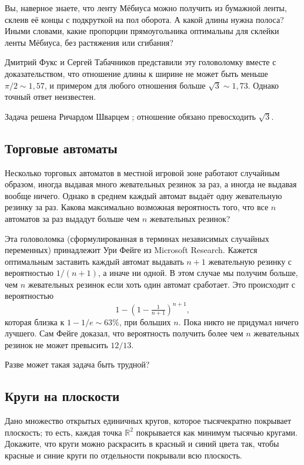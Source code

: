 Вы, наверное знаете, что ленту Мёбиуса можно получить из бумажной ленты, склеив её концы с подкруткой на пол оборота.
А какой длины нужна полоса?
Иными словами, какие пропорции прямоугольника оптимальны для склейки ленты Мёбиуса, без растяжения или сгибания?

Дмитрий Фукс и Сергей Табачников представили эту головоломку \cite[Лекция 14]{19} вместе с доказательством, что отношение длины к ширине не может быть меньше $\pi/2 \sim 1{,}57$, и примером для любого отношения больше $\sqrt{3} \sim 1{,}73$.
Однако точный ответ неизвестен.

\begin{addedbytheeditors}
Задача решена Ричардом Шварцем \cite{schwartz}; отношение обязано превосходить $\sqrt{3}$.\pr
\end{addedbytheeditors}


\subsection*{Торговые автоматы}

Несколько торговых автоматов в местной игровой зоне работают случайным образом,
иногда выдавая много жевательных резинок за раз, а иногда не выдавая вообще ничего.
Однако в среднем каждый автомат выдаёт одну жевательную резинку за раз.
Какова максимально возможная вероятность того, что все $n$ автоматов за раз выдадут больше чем $n$ жевательных резинок?

\medskip

Эта головоломка (сформулированная в терминах независимых случайных переменных) принадлежит Ури Фейге из Microsoft Research.
Кажется оптимальным заставить каждый автомат выдавать $n + 1$ жевательную резинку с вероятностью $1/(n + 1)$,
а иначе ни одной.
В этом случае мы получим больше, чем $n$ жевательных резинок если хоть один автомат сработает.
Это происходит с вероятностью
\[1-(1-\tfrac1{n+1})^{n+1},\]
которая близка к $1 - 1/e \sim 63\%$, при больших $n$.
Пока никто не придумал ничего лучшего.
Сам Фейге доказал, что вероятность получить более чем $n$ жевательных резинок не может превысить $12/13$.

Разве может такая задача быть трудной?

\subsection*{Круги на плоскости}

Дано множество открытых единичных кругов, которое тысячекратно покрывает плоскость;
то есть, каждая точка $\mathbb{R}^2$ покрывается как минимум тысячью кругами.
Докажите, что круги можно раскрасить в красный и синий цвета так,
чтобы красные и синие круги по отдельности покрывали всю плоскость.

